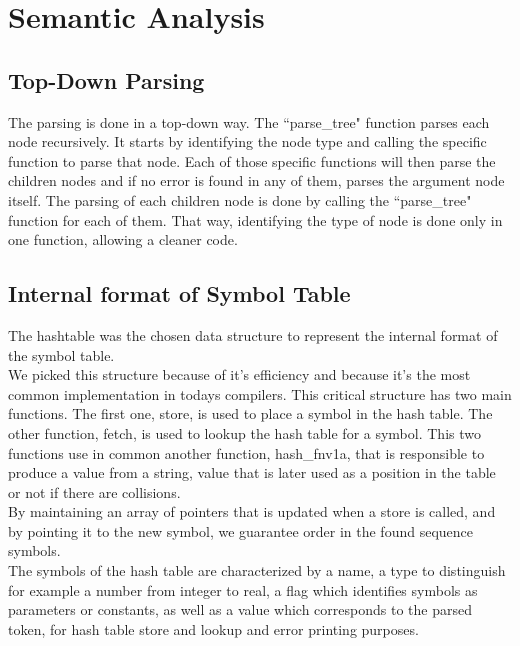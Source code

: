 \documentclass[12pt]{article}
\begin{document}
\newpage

\section{Semantic Analysis}

\subsection{Top-Down Parsing}

The parsing is done in a top-down way. The ``parse\_tree" function parses each node recursively. It starts by identifying the node type and calling the specific function to parse that node. Each of those specific functions will then parse the children nodes and if no error is found in any of them, parses the argument node itself. The parsing of each children node is done by calling the ``parse\_tree" function for each of them. That way, identifying the type of node is done only in one function, allowing a cleaner code.\\

\subsection{Internal format of Symbol Table}

The hashtable was the chosen data structure to represent the internal format of the symbol table. \\
We picked this structure because of it's efficiency and because it's the most common implementation in todays compilers. This critical structure has two main functions. The first one, store, is used to place a symbol in the hash table. The other function, fetch, is used to lookup the hash table for a symbol. This two functions use in common another function, hash\_fnv1a, that is responsible to produce a value from a string, value that is later used as a position in the table or not if there are collisions. \\
By maintaining an array of pointers that is updated when a store is called, and by pointing it to the new symbol, we guarantee order in the found sequence symbols. \\
The symbols of the hash table are characterized by a name, a type to distinguish for example a number from integer to real, a flag which identifies symbols as parameters or constants, as well as a value which corresponds to the parsed token, for hash table store and lookup and error printing purposes. \\
\end{document}
